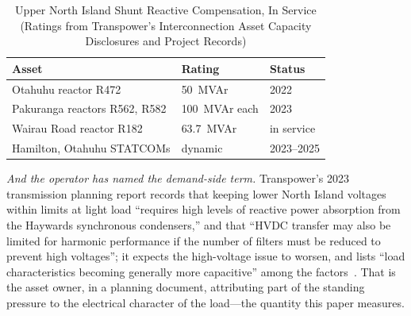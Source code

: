 \documentclass[journal]{IEEEtran}
\begin{document}
\begin{table}[!t]
\caption{Upper North Island Shunt Reactive Compensation, In Service (Ratings from
Transpower's Interconnection Asset Capacity Disclosures and Project Records)}
\label{tab:reactors}
\centering
\renewcommand{\arraystretch}{1.18}
\begin{tabular}{@{}p{}p{}p{}@{}}
\toprule
\textbf{Asset} & \textbf{Rating} & \textbf{Status} \\
\midrule
Otahuhu reactor R472          & 50~MVAr            & 2022 \\
Pakuranga reactors R562, R582 & 100~MVAr each & 2023 \\
Wairau Road reactor R182      & 63.7~MVAr & in service \\
Hamilton, Otahuhu STATCOMs    & dynamic            & 2023--2025 \\
\bottomrule
\end{tabular}
\end{table}

\emph{And the operator has named the demand-side term.} Transpower's 2023
transmission planning report records that keeping lower North Island voltages
within limits at light load ``requires high levels of reactive power
absorption from the Haywards synchronous condensers,'' and that ``HVDC
transfer may also be limited for harmonic performance if the number of filters
must be reduced to prevent high voltages''; it expects the high-voltage issue
to worsen, and lists ``load characteristics becoming generally more
capacitive'' among the factors~\cite{transpower_tpr2023}. That is the asset
owner, in a planning document, attributing part of the standing pressure to
the electrical character of the load---the quantity this paper measures.
\end{document}
